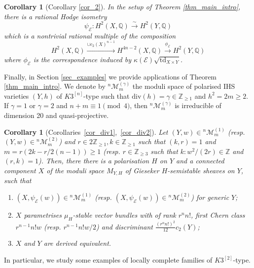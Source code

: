 \documentclass[12pt,a4paper]{amsart}
\theoremstyle{plain}
\newtheorem{maincor}[mainthm]{Corollary}
\theoremstyle{definition}
\theoremstyle{remark}
\def\td{\operatorname{td}}
\def\H{H}
\def\QQ{\mathbb{Q}}
\newcommand{\kE}{\mathcal{E}}
\newcommand{\ZZ}{\mathbb{Z}}
\newcommand{\dv}{\mathrm{div}}
\newcommand{\rathodge}[1]{\psi_{#1}}
\newcommand{\cc}{c}
\begin{document}
\begin{maincor}[Corollary \ref{cor_2}]\label{maincor3}
	In the setup of Theorem \ref{thm_main_intro}, there is a rational Hodge isometry
	\begin{equation*}
		 \rathodge{\kE}\colon\H^2(X,\mathbb{Q})\xrightarrow{\sim} \H^2(Y,\mathbb{Q})
	\end{equation*}
	which is a nontrivial rational multiple of the composition
	\begin{equation*}
		\H^2(X,\QQ)\xrightarrow{\cup \cc_2(X)^{n-1}}\H^{4n-2}(X,\QQ)\overset{\phi_{\kE}}{\longrightarrow}\H^2(Y,\QQ)
		\end{equation*}
		where $\phi_{\kE}$ is the correspondence induced by $\kappa(\kE)\sqrt{\td_{X\times Y}}$.    
\end{maincor}
Finally, in Section \ref{sec_examples} we provide applications of Theorem \ref{thm_main_intro}. 
We denote by ${}^{n}\mathcal{M}_{m}^{(\gamma)}$ the moduli space of polarised IHS varieties $(Y,h)$ of $K3^{[n]}$-type such that $\dv(h)=\gamma\in \ZZ_{\geq 1}$ and $h^2=2m\geq 2$. If $\gamma=1$ or $\gamma=2$ and $n+m\equiv 1\pmod{4}$, then ${}^{n}\mathcal{M}_{m}^{(\gamma)}$ is irreducible of dimension 20 and quasi-projective.
\begin{maincor}[Corollaries~\ref{cor_div1},~\ref{cor_div2}]\label{cor_intro_mainthm_alldim}
    Let $(Y,w)\in {}^{n}\mathcal{M}_{m}^{(1)}$ (resp. $(Y,w)\in {}^{n}\mathcal{M}_{m}^{(2)}$) and $r\in 2\ZZ_{\geq 1},k\in \ZZ_{\geq 1}$ such that $(k,r)=1$ and $m=r(2k-r/2(n-1))\geq 1$ (resp.  $r\in \ZZ_{\geq 3}$ such that $k:w^2/(2r)\in \ZZ$ and $(r,k)=1$).
    Then, there there is a polarisation $H$ on $Y$ and a connected component $X$ of the moduli space $M_{Y,H}$ of Gieseker $H$-semistable sheaves on $Y$, such that
    \begin{enumerate}
        \item [{\normalfont{(1)}}] $(X,\rathodge{\kE}(w))\in {}^{n}\mathcal{M}_{m}^{(1)}$ (resp. $(X, \rathodge{\kE}(w))\in {}^{n}\mathcal{M}_{m}^{(2)}$) for generic $Y$;
        \item [{\normalfont{(2)}}] $X$ parametrises $\mu_H$-stable vector bundles with of rank $r^n n!$, 
        first Chern class $r^{n-1}n!w$ \linebreak[4](resp. $r^{n-1}n!w/2$) 
        and discriminant $\frac{(r^n n!)^2}{12}\cc_2(Y)$;
        \item [{\normalfont{(3)}}] $X$ and $Y$ are derived equivalent.
    \end{enumerate}
\end{maincor}
In particular, we study some examples of locally complete families of $K3^{[2]}$-type. 
\end{document}
